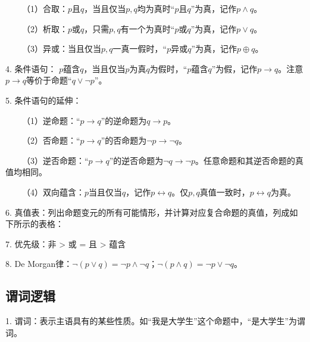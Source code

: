 ~~~~（1）合取：$p$且$q$，当且仅当$p,q$均为真时“$p$且$q$”为真，记作$p \wedge q$。

~~~~（2）析取：$p$或$q$，只需$p,q$有一个为真时“$p$或$q$”为真，记作$p \vee q$。

~~~~（3）异或：当且仅当$p,q$一真一假时，“$p$异或$q$”为真，记作$p \oplus q$。

4. 条件语句： $p$蕴含$q$，当且仅当$p$为真$q$为假时，“$p$蕴含$q$”为假，记作$p \rightarrow q$。注意$p \rightarrow q$等价于命题“$q \vee \neg p$”。

5. 条件语句的延伸：

~~~~（1）逆命题：“$p \rightarrow q$”的逆命题为$q \rightarrow p$。

~~~~（2）否命题：“$p \rightarrow q$”的否命题为$\neg p \rightarrow \neg q$。

~~~~（3）逆否命题：“$p \rightarrow q$”的逆否命题为$\neg q \rightarrow \neg p$。任意命题和其逆否命题的真值均相同。

~~~~（4）双向蕴含：$p$当且仅当$q$，记作$p \leftrightarrow q$。仅$p,q$真值一致时，$p \leftrightarrow q$为真。

6. 真值表：列出命题变元的所有可能情形，并计算对应复合命题的真值，列成如下所示的表格：

\begin{table}[H]
    \centering
\end{table}

7. 优先级：非 > 或 = 且 > 蕴含

8. De Morgan律：$\neg (p \vee q) = \neg p \wedge \neg q$；$\neg (p \wedge q) = \neg p \vee \neg q$。

\subsection{谓词逻辑}

1. 谓词：表示主语具有的某些性质。如“我是大学生”这个命题中，“是大学生”为谓词。

